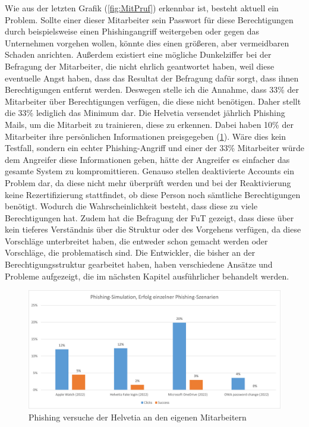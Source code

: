 Wie aus der letzten Grafik (\ref{fig:MitPruf}) erkennbar ist, besteht aktuell ein Problem.
Sollte einer dieser Mitarbeiter sein Passwort für diese Berechtigungen durch beispielsweise einen Phishingangriff weitergeben oder gegen das Unternehmen vorgehen wollen, könnte dies einen größeren, aber vermeidbaren Schaden anrichten.
Außerdem existiert eine mögliche Dunkelziffer bei der Befragung der Mitarbeiter, die nicht ehrlich geantwortet haben, weil diese eventuelle Angst haben, dass das Resultat der Befragung dafür sorgt, dass ihnen Berechtigungen entfernt werden.
Deswegen stelle ich die Annahme, dass 33\% der Mitarbeiter über Berechtigungen verfügen, die diese nicht benötigen.
Daher stellt die 33\% lediglich das Minimum dar.
Die Helvetia versendet jährlich Phishing Mails, um die Mitarbeit zu trainieren, diese zu erkennen.
Dabei haben 10\% der Mitarbeiter ihre persönlichen Informationen preisgegeben (\ref{fig:Bef}).
Wäre dies kein Testfall, sondern ein echter Phishing-Angriff und einer der 33\% Mitarbeiter würde dem Angreifer diese Informationen geben, hätte der Angreifer es einfacher das gesamte System zu kompromittieren.
\newline
\newline
Genauso stellen deaktivierte Accounts ein Problem dar, da diese nicht mehr überprüft werden und bei der Reaktivierung keine Rezertifizierung stattfindet, ob diese Person noch sämtliche Berechtigungen benötigt.
Wodurch die Wahrscheinlichkeit besteht, dass diese zu viele Berechtigungen hat.
Zudem hat die Befragung der \ac{FuT} gezeigt, dass diese über kein tieferes Verständnis über die Struktur oder des Vorgehens verfügen, da diese Vorschläge unterbreitet haben, die entweder schon gemacht werden oder Vorschläge, die problematisch sind.
Die Entwickler, die bisher an der Berechtigungsstruktur gearbeitet haben, haben verschiedene Ansätze und Probleme aufgezeigt, die im nächsten Kapitel ausführlicher behandelt werden.
\begin{figure}[h!]
 \centering
 \includegraphics[width=1\textwidth]{gfx/Picture/Befragung.PNG}
 \caption{Phishing versuche der Helvetia an den eigenen Mitarbeitern \cite{Helvetia}}
 \label{fig:Bef}
\end{figure}

